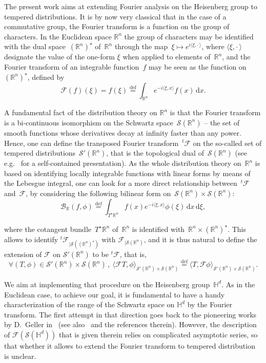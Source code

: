 \documentclass[11pt]{article}
\theoremstyle{definition}
\numberwithin{equation}{section}
\numberwithin{figure}{section}
\numberwithin{table}{section}
\newcommand{\wh}{\widehat}
\newcommand*\cB{\mathcal{B}}
\newcommand*\cF{\mathcal{F}}
\newcommand*\cS{\mathcal{S}}
\newcommand*\R{\mathbb{R}}
\newcommand*\bbH{\mathbb{H}}
\newcommand*\eqdefa{\overset{\mathrm{def}}{=}}
\newcommand*{\dd}{\mathrm{d}}
\newcommand{\dx}{\dd x}
\newcommand{\dxi}{\dd \xi}
\let\oldforall\forall
\renewcommand*{\forall}{\mathrel{\oldforall}}
\begin{document}
The present work aims at extending Fourier analysis on the Heisenberg group to tempered distributions. It is by now very classical that in the case of a commutative group, the Fourier transform is a function on the group of characters. In the Euclidean space $\R^n$ the group of characters may be identified with the dual space~$(\R^n)^\star$ of~$\R^n$ through the map~$\xi \mapsto e^{i\langle \xi,{\cdot\,}\rangle}$, where $\langle \xi,{\cdot\,}\rangle$ designate the value of the one-form $\xi$ when applied to elements of~$\R^n$, and the Fourier transform of an integrable function~$f$ may be seen as the function on $(\R^n)^\star$, defined by
\begin{equation}\label{definFourierclassic}
\cF (f) (\xi) = \wh f(\xi)\eqdefa \int_{\R^n} e^{-i\langle \xi,x\rangle } f(x)\, \dx.
\end{equation}

A fundamental fact of the distribution theory on $\R^n$ is that the Fourier transform is a bi-continuous isomorphism on the Schwartz space~$\cS(\R^n)$ -- the set of smooth functions whose derivatives decay at infinity faster than any power. Hence, one can define the transposed Fourier transform~${}^t\!\cF$ on the so-called set of tempered distributions~$\cS'(\R^n)$, that is the topological dual of~$\cS(\R^n)$ (see e.g.~\cite{rudin, S} for a self-contained presentation). As the whole distribution theory on~$\R^n$ is based on identifying locally integrable functions with linear forms by means of the Lebesgue integral, one can look for a more direct relationship between~${}^t\!\cF$ and~$\cF$, by considering the following bilinear form on~$\cS(\R^n)\times\cS(\R^n)$:
\begin{equation}\label{definFourierRbilin}
\cB_\R (f,\phi)\eqdefa \int_{T^\star \R^n} f(x) e^{-i\langle \xi,x\rangle} \phi(\xi) \,\dx \,\dxi,
\end{equation}

where the cotangent bundle~$T^\star \R^n$ of~$\R^n$ is identified with~$\R^n\times (\R^n)^\star$. This allows to identify ${}^t\!\cF_{|\cS((\R^n)^\star)}$ with $\cF_{|\cS(\R^n)}$, and it is thus natural to define the extension of $\cF$ on $\cS'(\R^n)$ to be ${}^t\!\cF$, that is,
\begin{equation}\label{definFourierS'}
\forall (T,\phi) \in \cS'(\R^n)\times\cS(\R^n)\,,\ \langle \cF T,\phi\rangle_{\cS'(\R^n)\times\cS(\R^n)}\eqdefa \langle T,\cF \phi\rangle_{\cS'(\R^n)\times\cS(\R^n)}.
\end{equation}

We aim at implementing that procedure on the Heisenberg group~$\bbH^d$. As in the Euclidean case, to achieve our goal, it is fundamental to have a handy characterization of the range of the Schwartz space on $\bbH^d$ by the Fourier transform. The first attempt in that direction goes back to the pioneering works by D.~Geller in~\cite{geller, geller2} (see also~\cite{astengo2,F,thangavelu2} and the references therein). However, the description of $\cF(\cS(\bbH^d))$ that is given therein relies on complicated asymptotic series, so that whether it allows to extend the Fourier transform to tempered distribution is unclear.
\end{document}
